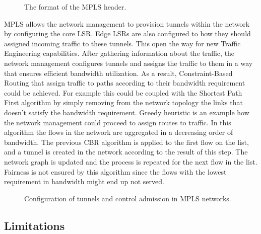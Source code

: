\begin{figure}[h]
\begin{center}

\caption{
  The format of the MPLS header.
  \label{fig:mpls-header}
}
\end{center}
\end{figure}

MPLS allows the network management to provision tunnels within the network by configuring the core LSR. Edge LSRs are also configured to how they should assigned incoming traffic to these tunnels. This open the way for new Traffic Engineering capabilities. After gathering information about the traffic, the network management configures tunnels and assigns the traffic to them in a way that ensures efficient bandwidth utilization. As a result, Constraint-Based Routing that assign traffic to paths according to their bandwidth requirement could be achieved. For example this could be coupled with the Shortest Path First algorithm by simply removing from the network topology the links that doesn't satisfy the bandwidth requirement. Greedy heuristic is an example how the network management could proceed to assign routes to traffic. In this algorithm the flows in the network are aggregated in a decreasing order of bandwidth. The previous CBR algorithm is applied to the first flow on the list, and a tunnel is created in the network according to the result of this step. The network graph is updated and the process is repeated for the next flow in the list. Fairness is not ensured by this algorithm since the flows with the lowest requirement in bandwidth might end up not served.

\begin{figure}[h]
\begin{center}

\caption{
  Configuration of tunnels and control admission in MPLS networks.
  \label{fig:mpls-header}
}

\end{center}
\end{figure}


\subsection{Limitations}

